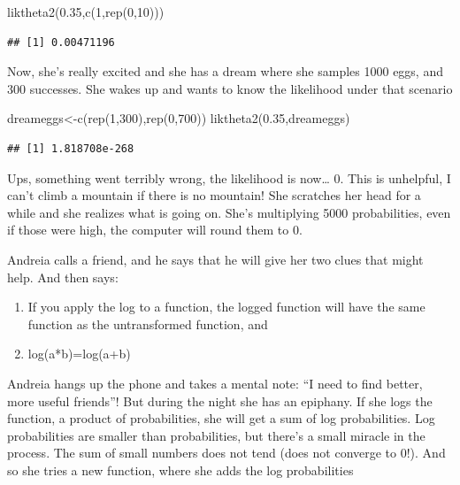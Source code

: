 \documentclass[
]{book}
\newenvironment{Shaded}{\begin{snugshade}}{\end{snugshade}}
\newcommand{\DecValTok}[1]{\textcolor[rgb]{0.00,0.00,0.81}{#1}}
\newcommand{\FloatTok}[1]{\textcolor[rgb]{0.00,0.00,0.81}{#1}}
\newcommand{\FunctionTok}[1]{\textcolor[rgb]{0.00,0.00,0.00}{#1}}
\newcommand{\NormalTok}[1]{#1}
\newcommand{\OtherTok}[1]{\textcolor[rgb]{0.56,0.35,0.01}{#1}}
\begin{document}
\begin{Shaded}
\begin{Highlighting}[]
\FunctionTok{liktheta2}\NormalTok{(}\FloatTok{0.35}\NormalTok{,}\FunctionTok{c}\NormalTok{(}\DecValTok{1}\NormalTok{,}\FunctionTok{rep}\NormalTok{(}\DecValTok{0}\NormalTok{,}\DecValTok{10}\NormalTok{)))}
\end{Highlighting}
\end{Shaded}

\begin{verbatim}
## [1] 0.00471196
\end{verbatim}

Now, she's really excited and she has a dream where she samples 1000 eggs, and 300 successes. She wakes up and wants to know the likelihood under that scenario

\begin{Shaded}
\begin{Highlighting}[]
\NormalTok{dreameggs}\OtherTok{\textless{}{-}}\FunctionTok{c}\NormalTok{(}\FunctionTok{rep}\NormalTok{(}\DecValTok{1}\NormalTok{,}\DecValTok{300}\NormalTok{),}\FunctionTok{rep}\NormalTok{(}\DecValTok{0}\NormalTok{,}\DecValTok{700}\NormalTok{))}
\FunctionTok{liktheta2}\NormalTok{(}\FloatTok{0.35}\NormalTok{,dreameggs)}
\end{Highlighting}
\end{Shaded}

\begin{verbatim}
## [1] 1.818708e-268
\end{verbatim}

Ups, something went terribly wrong, the likelihood is now\ldots{} 0. This is unhelpful, I can't climb a mountain if there is no mountain! She scratches her head for a while and she realizes what is going on. She's multiplying 5000 probabilities, even if those were high, the computer will round them to 0.

Andreia calls a friend, and he says that he will give her two clues that might help. And then says:

\begin{enumerate}
\def\labelenumi{\arabic{enumi}.}
\item
  If you apply the log to a function, the logged function will have the same function as the untransformed function, and
\item
  log(a*b)=log(a+b)
\end{enumerate}

Andreia hangs up the phone and takes a mental note: ``I need to find better, more useful friends''! But during the night she has an epiphany. If she logs the function, a product of probabilities, she will get a sum of log probabilities. Log probabilities are smaller than probabilities, but there's a small miracle in the process. The sum of small numbers does not tend (does not converge to 0!). And so she tries a new function, where she adds the log probabilities
\end{document}
